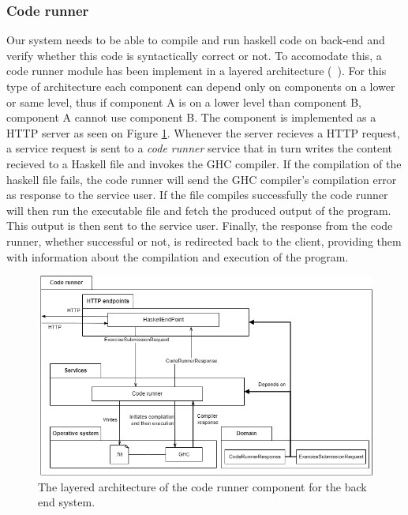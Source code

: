 \subsubsection{Code runner}
Our system needs to be able to compile and run haskell code on back-end and verify whether this code is syntactically correct or not.
To accomodate this, a code runner module has been implement in a layered architecture (~\cite{roede_aalborg}).
For this type of architecture each component can depend only on components on a lower or same level, thus if component A is on a lower level than component B, component A cannot use component B.
The component is implemented as a HTTP server as seen on Figure \ref{fig:code_runner}.
Whenever the server recieves a HTTP request, a service request is sent to a \textit{code runner} service that in turn writes the content recieved to a Haskell file and invokes the GHC compiler.
If the compilation of the haskell file fails, the code runner will send the GHC compiler's compilation error as response to the service user.
If the file compiles successfully the code runner will then run the executable file and fetch the produced output of the program.
This output is then sent to the service user.
Finally, the response from the code runner, whether successful or not, is redirected back to the client, providing them with information about the compilation and execution of the program.
\begin{figure}
    \centering
    \includegraphics[width=\textwidth,height=\textheight,keepaspectratio]{sections/Chapter 2/pics/P7 arch-Backend - HS compiler.drawio.png}
    \caption[]{The layered architecture of the code runner component for the back end system.}
    \label{fig:code_runner}
\end{figure}

